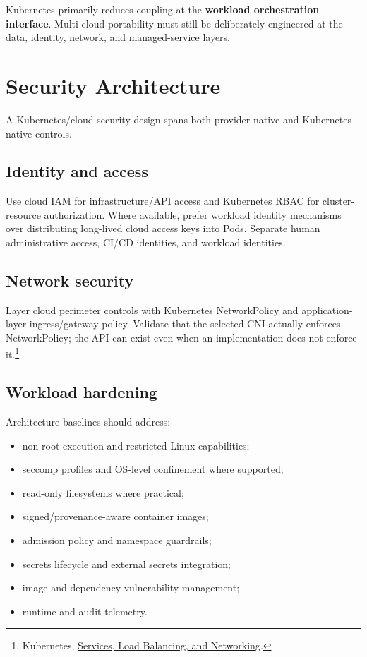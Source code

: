 \documentclass[11pt]{article}
\newcommand{\src}[2]{\href{#2}{#1}}
\begin{document}
\begin{keyidea}
Kubernetes primarily reduces coupling at the \textbf{workload orchestration interface}. Multi-cloud portability must still be deliberately engineered at the data, identity, network, and managed-service layers.
\end{keyidea}

\section{Security Architecture}

A Kubernetes/cloud security design spans both provider-native and Kubernetes-native controls.

\subsection{Identity and access}
Use cloud IAM for infrastructure/API access and Kubernetes RBAC for cluster-resource authorization. Where available, prefer workload identity mechanisms over distributing long-lived cloud access keys into Pods. Separate human administrative access, CI/CD identities, and workload identities.

\subsection{Network security}
Layer cloud perimeter controls with Kubernetes NetworkPolicy and application-layer ingress/gateway policy. Validate that the selected CNI actually enforces NetworkPolicy; the API can exist even when an implementation does not enforce it.\footnote{Kubernetes, \src{Services, Load Balancing, and Networking}{https://kubernetes.io/docs/concepts/services-networking/}.}

\subsection{Workload hardening}
Architecture baselines should address:

\begin{itemize}
  \item non-root execution and restricted Linux capabilities;
  \item seccomp profiles and OS-level confinement where supported;
  \item read-only filesystems where practical;
  \item signed/provenance-aware container images;
  \item admission policy and namespace guardrails;
  \item secrets lifecycle and external secrets integration;
  \item image and dependency vulnerability management;
  \item runtime and audit telemetry.
\end{itemize}
\end{document}
